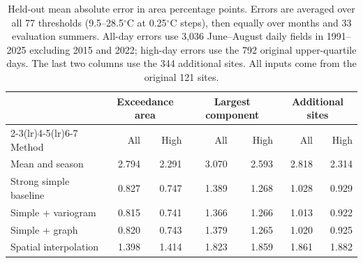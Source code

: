 \begin{table}[H]
\centering\normalsize
\renewcommand{\arraystretch}{1.5}
\caption{Held-out mean absolute error in area percentage points. Errors are
averaged over all 77 thresholds (9.5--28.5$^\circ$C at 0.25$^\circ$C steps),
then equally over months and 33 evaluation summers. All-day errors use 3,036
June--August daily fields in 1991--2025 excluding 2015 and 2022; high-day errors
use the 792 original upper-quartile days. The last two columns use the 344
additional sites. All inputs come from the original 121 sites.}
\label{tab:application-comparison}
\begin{tabular*}{\textwidth}{@{\extracolsep{\fill}}lrrrrrr@{}}
\toprule
& \multicolumn{2}{c}{Exceedance area} & \multicolumn{2}{c}{Largest component} & \multicolumn{2}{c}{Additional sites}\\
\cmidrule(lr){2-3}\cmidrule(lr){4-5}\cmidrule(lr){6-7}
Method & All & High & All & High & All & High\\
\midrule
Mean and season & 2.794 & 2.291 & 3.070 & 2.593 & 2.818 & 2.314 \\
Strong simple baseline & 0.827 & 0.747 & 1.389 & 1.268 & 1.028 & 0.929 \\
Simple + variogram & 0.815 & 0.741 & 1.366 & 1.266 & 1.013 & 0.922 \\
Simple + graph & 0.820 & 0.743 & 1.379 & 1.265 & 1.020 & 0.925 \\
Spatial interpolation & 1.398 & 1.414 & 1.823 & 1.859 & 1.861 & 1.882 \\
\bottomrule
\end{tabular*}
\end{table}
